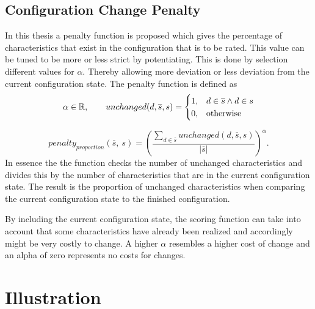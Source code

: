 \subsection{Configuration Change Penalty}
\label{subsec:Concept:ReccomendationGeneration:Penalty}

In this thesis a penalty function is proposed which gives the percentage of characteristics that exist in the configuration that is to be rated. This value can be tuned to be more or less strict by potentiating. This is done by selection different values for $\alpha$. Thereby allowing more deviation or less deviation from the current configuration state. The penalty function is defined as
\begin{equation}
    \notag \alpha \in \mathbb{R}, \qquad     unchanged(d,\overline{s}, s) = 
    \begin{cases}
      1, & d \in \overline{s} \land d \in s \\
      0, & \text{otherwise}
    \end{cases}
\end{equation}

\begin{equation}
    penalty_{proportion}(\overline{s},\ s) =  \left(\frac{\sum_{d \in \overline{s}} unchanged(d,\overline{s}, s)}{|\overline{s}|}\right)^\alpha.
\end{equation}
In essence the the function checks the number of unchanged characteristics and divides this by the number of characteristics that are in the current configuration state. The result is the proportion of unchanged characteristics when comparing the current configuration state to the finished configuration.

By including the current configuration state, the scoring function can take into account that some characteristics have already been realized and accordingly might be very costly to change. A higher $\alpha$ resembles a higher cost of change and an alpha of zero represents no costs for changes.

\section{Illustration}
\label{sec:Concept:Illustration}

